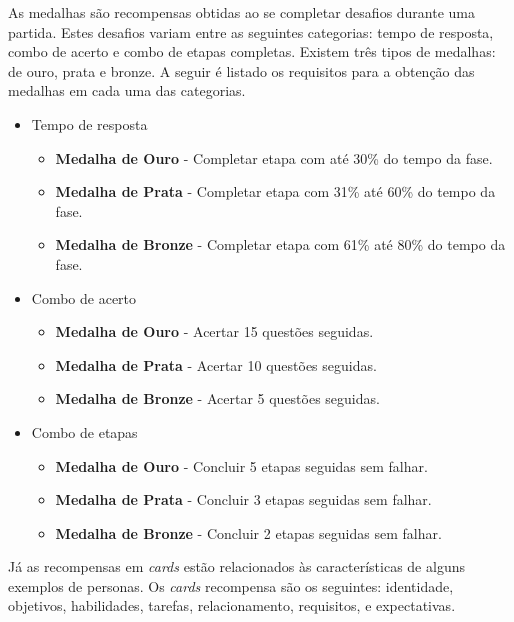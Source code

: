 {\color{textadded}
As medalhas são recompensas obtidas ao se completar desafios durante uma partida. Estes desafios variam entre as seguintes categorias: tempo de resposta, combo de acerto e combo de etapas completas. Existem três tipos de medalhas: de ouro, prata e bronze. A seguir é listado os requisitos para a obtenção das medalhas em cada uma das categorias.

\begin{itemize}
    \item Tempo de resposta
    \begin{itemize}
        \item \textbf{Medalha de Ouro} - Completar etapa com até 30\% do tempo da fase.
        \item \textbf{Medalha de Prata} - Completar etapa com 31\% até 60\% do tempo da fase.
        \item \textbf{Medalha de Bronze} - Completar etapa com 61\% até 80\% do tempo da fase.
    \end{itemize}
    \item Combo de acerto
    \begin{itemize}
        \item \textbf{Medalha de Ouro} - Acertar 15 questões seguidas.
        \item \textbf{Medalha de Prata} - Acertar 10 questões seguidas.
        \item \textbf{Medalha de Bronze} - Acertar 5 questões seguidas.
    \end{itemize}
    \item Combo de etapas
    \begin{itemize}
        \item \textbf{Medalha de Ouro} - Concluir 5 etapas seguidas sem falhar.
        \item \textbf{Medalha de Prata} - Concluir 3 etapas seguidas sem falhar.
        \item \textbf{Medalha de Bronze} - Concluir 2 etapas seguidas sem falhar.
    \end{itemize}
\end{itemize}

}

{\color{textmodified}
Já as recompensas em \textit{cards} estão relacionados às características de alguns exemplos de personas. Os \textit{cards} recompensa são os seguintes: identidade, objetivos, habilidades, tarefas, relacionamento, requisitos, e expectativas. 
}


